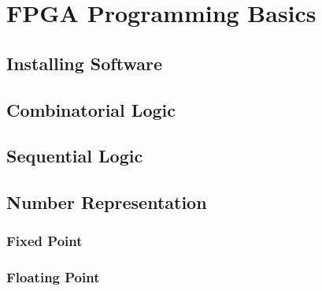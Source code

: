 \chapter{FPGA Programming Basics}

\section{Installing Software}

\section{Combinatorial Logic}

\section{Sequential Logic}

\section{Number Representation}
\subsection{Fixed Point}
\subsection{Floating Point}

